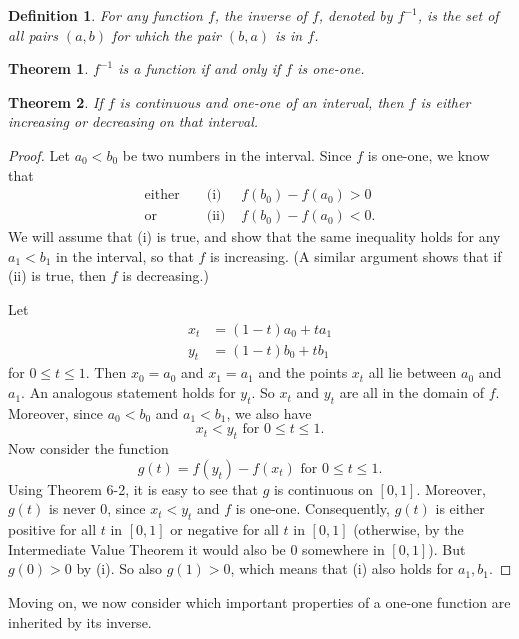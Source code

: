 \documentclass{article}
\numberwithin{corollary}{subsection}
\newtheorem{definition}{Definition}
\numberwithin{definition}{subsection}
\numberwithin{lemma}{subsection}
\newtheorem{theorem}{Theorem}
\numberwithin{theorem}{subsection}
\begin{document}
\begin{definition}
  For any function $f$, the \emph{inverse} of $f$, denoted by $f^{-1}$, is the
  set of all pairs $(a, b)$ for which the pair $(b, a)$ is in $f$.
\end{definition}

\begin{theorem}
  $f^{-1}$ is a function if and only if $f$ is one-one.
\end{theorem}

\begin{theorem}
  If $f$ is continuous and one-one of an interval, then $f$ is either
  increasing or decreasing on that interval.
\end{theorem}
\begin{proof}
  Let $a_0 < b_0$ be two numbers in the interval. Since $f$ is one-one, we know
  that
  \begin{align*}
    \text{either} &&\text{ (i) } &f(b_0) - f(a_0) > 0 \\
    \text{or} &&\text{ (ii) } &f(b_0) - f(a_0) < 0.
  \end{align*}
  We will assume that (i) is true, and show that the same inequality holds for
  any $a_1 < b_1$ in the interval, so that $f$ is increasing. (A similar
  argument shows that if (ii) is true, then $f$ is decreasing.)

  Let
  \begin{align*}
    x_t &= (1 - t)a_0 + ta_1 \\
    y_t &= (1 - t)b_0 + tb_1
  \end{align*}
  for $0 \leq t \leq 1$. Then $x_0 = a_0$ and $x_1 = a_1$ and the points $x_t$
  all lie between $a_0$ and $a_1$. An analogous statement holds for $y_t$. So
  $x_t$ and $y_t$ are all in the domain of $f$. Moreover, since $a_0 < b_0$ and
  $a_1 < b_1$, we also have \[
    x_t < y_t \text{ for } 0 \leq t \leq 1.
  \] Now consider the function \[
    g(t) = f(y_t) - f(x_t) \text{ for } 0 \leq t \leq 1.
  \] Using Theorem 6-2, it is easy to see that $g$ is continuous on $[0, 1]$.
  Moreover, $g(t)$ is never 0, since $x_t < y_t$ and $f$ is one-one.
  Consequently, $g(t)$ is either positive for all $t$ in $[0, 1]$ or negative
  for all $t$ in $[0, 1]$ (otherwise, by the Intermediate Value Theorem it
  would also be 0 somewhere in $[0, 1]$). But $g(0) > 0$ by (i). So also $g(1)
  > 0$, which means that (i) also holds for $a_1, b_1$.
\end{proof}

Moving on, we now consider which important properties of a one-one function are
inherited by its inverse.
\end{document}
